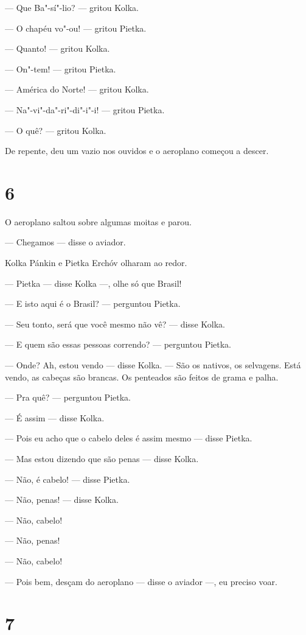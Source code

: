 --- Que Ba"-sí"-lio? --- gritou Kolka.

--- O chapéu vo"-ou! --- gritou Pietka.

--- Quanto! --- gritou Kolka.

--- On"-tem! --- gritou Pietka.

--- América do Norte! --- gritou Kolka.

--- Na"-vi"-da"-ri"-di"-i"-i! --- gritou Pietka.

--- O quê? --- gritou Kolka.

De repente, deu um vazio nos ouvidos e o aeroplano começou a descer.

\section{6}

O aeroplano saltou sobre algumas moitas e parou.

--- Chegamos --- disse o aviador.

Kolka Pánkin e Pietka Erchóv olharam ao redor.

--- Pietka --- disse Kolka ---, olhe só que Brasil!

--- E isto aqui é o Brasil? --- perguntou Pietka.

--- Seu tonto, será que você mesmo não vê? --- disse Kolka.

--- E quem são essas pessoas correndo? --- perguntou Pietka.

--- Onde? Ah, estou vendo --- disse Kolka. --- São os nativos, os
selvagens. Está vendo, as cabeças são brancas. Os penteados são feitos
de grama e palha.

--- Pra quê? --- perguntou Pietka.

--- É assim --- disse Kolka.

--- Pois eu acho que o cabelo deles é assim mesmo --- disse Pietka.

--- Mas estou dizendo que são penas --- disse Kolka.

--- Não, é cabelo! --- disse Pietka.

--- Não, penas! --- disse Kolka.

--- Não, cabelo!

--- Não, penas!

--- Não, cabelo!

--- Pois bem, desçam do aeroplano --- disse o aviador ---, eu preciso
voar.

\section{7}

